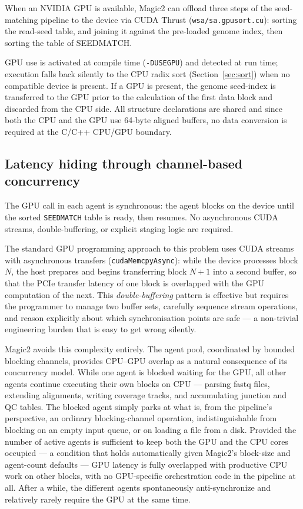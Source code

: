 \documentclass[11pt]{article}
\begin{document}
When an NVIDIA GPU is available, Magic2 can offload three steps of the
seed-matching pipeline to the device via CUDA Thrust
(\texttt{wsa/sa.gpusort.cu}): sorting the read-seed table,
and joining it against the pre-loaded genome index,
then sorting the table of SEEDMATCH.

GPU use is activated at compile time (\texttt{-DUSEGPU}) and detected
at run time; execution falls back silently to the CPU radix sort
(Section~\ref{sec:sort}) when no compatible device is present.
If a GPU is present, the genome seed-index is transferred to the GPU
prior to the calculation of the first data block and discarded from
the CPU side.
All structure declarations are shared and since both the CPU
and the GPU use 64-byte aligned buffers,
no data conversion is required at the C/C++ CPU/GPU boundary.

\subsection{Latency hiding through channel-based concurrency}
\label{sec:latency_hiding}

The GPU call in each agent is synchronous: the agent blocks on the
device until the sorted \texttt{SEEDMATCH} table is ready, then
resumes.
No asynchronous CUDA streams, double-buffering, or explicit staging
logic are required.

The standard GPU programming approach to this problem uses CUDA
streams with asynchronous transfers (\texttt{cudaMemcpyAsync}):
while the device processes block $N$, the host prepares and begins
transferring block $N+1$ into a second buffer, so that the PCIe
transfer latency of one block is overlapped with the GPU computation
of the next.
This \emph{double-buffering} pattern is effective but requires the
programmer to manage two buffer sets, carefully sequence stream
operations, and reason explicitly about which synchronisation points
are safe --- a non-trivial engineering burden that is easy to get
wrong silently.

Magic2 avoids this complexity entirely.
The agent pool, coordinated by bounded blocking channels, provides
CPU--GPU overlap as a natural consequence of its concurrency model.
While one agent is blocked waiting for the GPU, all other agents
continue executing their own blocks on CPU --- parsing fastq files,
extending alignments, writing coverage tracks, and accumulating
junction and QC tables.
The blocked agent simply parks at what is, from the pipeline's
perspective, an ordinary blocking-channel operation, indistinguishable
from blocking on an empty input queue, or on loading a file from a disk.
Provided the number of active agents is sufficient to keep both the
GPU and the CPU cores occupied --- a condition that holds automatically
given Magic2's block-size and agent-count defaults --- GPU latency
is fully overlapped with productive CPU work on other
blocks, with no GPU-specific orchestration code in the pipeline at all.
After a while, the different agents spontaneously anti-synchronize and
relatively rarely require the GPU at the same time.
\end{document}
